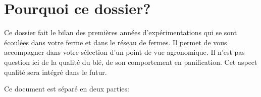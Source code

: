 \chapter{Pourquoi ce dossier?}

Ce dossier fait le bilan des premières années d'expérimentations qui se sont écoulées dans votre ferme et dans le réseau de fermes.
Il permet de vous accompagner dans votre sélection d'un point de vue agronomique.
Il n'est pas question ici de la qualité du blé, de son comportement en panification.
Cet aspect qualité sera intégré dans le futur.


Ce document est séparé en deux parties:

